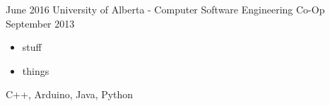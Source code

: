 
  

\begin{experiences}
    \experience
      {June 2016}   {University of Alberta - Computer Software Engineering Co-Op}{}{}
      {September 2013} {
                        \begin{itemize}
                          \item stuff
                          \item things
                        \end{itemize}
                      }
                      {
                        C++,
                        Arduino,
                        Java,
                        Python
                      }
  
  \end{experiences}